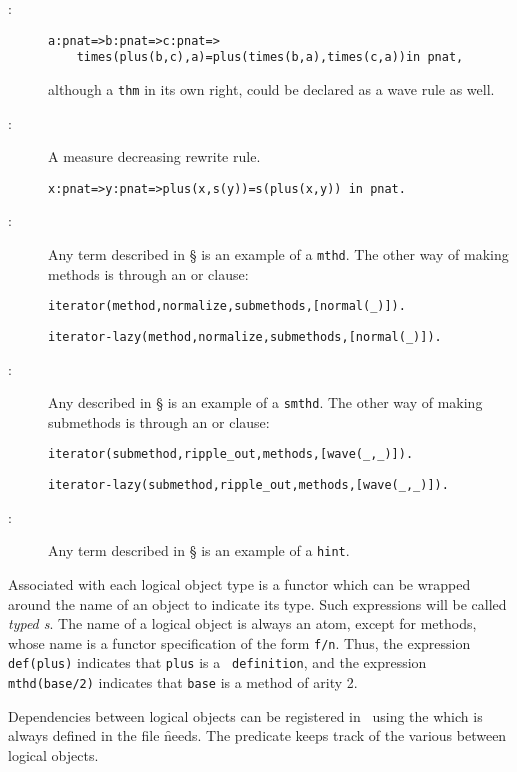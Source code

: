 \begin{description}
\item[{\tt {}}:]
\begin{verbatim}
a:pnat=>b:pnat=>c:pnat=>
    times(plus(b,c),a)=plus(times(b,a),times(c,a))in pnat,
\end{verbatim}
although a {\tt thm} in its own right, could be declared as a wave
rule as well.
\item[{\tt {}}:] A measure decreasing rewrite rule.
\begin{verbatim}
x:pnat=>y:pnat=>plus(x,s(y))=s(plus(x,y)) in pnat.
\end{verbatim}
\item[{\tt {}}:]
Any  term described in \S{} is
an example of a {\tt mthd}. The other way of making methods is through
an  or  clause:
\begin{verbatim}
iterator(method,normalize,submethods,[normal(_)]).
\end{verbatim}
\begin{verbatim}
iterator-lazy(method,normalize,submethods,[normal(_)]).
\end{verbatim}
\item[{\tt {}}:]
Any  described in \S{} is an
example of a {\tt smthd}. The other way of making submethods is
through an 
 or  clause:
\begin{verbatim}
iterator(submethod,ripple_out,methods,[wave(_,_)]).
\end{verbatim}
\begin{verbatim}
iterator-lazy(submethod,ripple_out,methods,[wave(_,_)]).
\end{verbatim}
\item[{\tt {}}:]
Any  term described in \S{} is
an example of a {\tt hint}.
\end{description}

Associated with each logical object type is a functor which can be
wrapped around the name of an object to indicate its type. Such
expressions will be called {\em typed s}. The
name of a logical object is always an atom, except for methods,
whose name is a functor specification of the form {\tt f/n}. Thus, the
expression {\tt def(plus)} indicates that {\tt plus} is a {\tt
definition}, and the expression {\tt mthd(base/2)} indicates that {\tt base}
is a method of arity 2.

Dependencies between logical objects can be registered in \clam\ using
the  which is always
defined in the file \f{needs}.  The predicate  keeps track
of the various  between logical objects.

